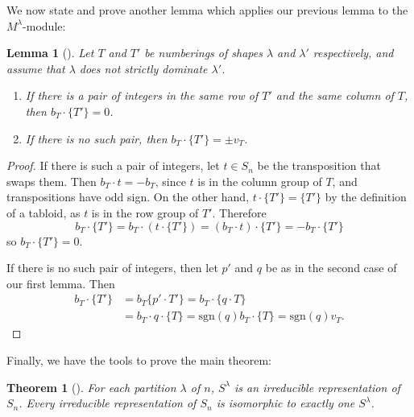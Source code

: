 \documentclass[12pt,twoside]{reedthesis}
\theoremstyle{plain}   %
\newtheorem{thm}{Theorem}[section] %
\newtheorem{lemma}{Lemma}[section]
\theoremstyle{definition}
\theoremstyle{remark}
\numberwithin{equation}{section}
\def\sgn{\mathrm{sgn}}
\begin{document}
  We now state and prove another lemma which applies our previous lemma to the $M^\lambda$-module:
  \begin{lemma}[{\cite[Lemma 7.2]{fulton}}]\label{lem2}
    Let $T$ and $T'$ be numberings of shapes $\lambda$ and $\lambda'$ respectively,
    and assume that $\lambda$ does not strictly dominate $\lambda'$. \\
    \begin{enumerate}

    \item If there is a pair of integers in the same row of $T'$ and the same column of $T$, then $b_T \cdot \{T'\} = 0$.
    \item If there is no such pair, then $b_T \cdot \{T'\} = \pm v_T$.
    \end{enumerate}
  \end{lemma}
  \begin{proof}    
    If there is such a pair of integers, let $t \in S_n$ be the transposition that swaps them.
    Then $b_T \cdot t = -b_T$, since $t$ is in the column group of $T$, and transpositions have odd sign.
    On the other hand, $t \cdot \{T'\} = \{T'\}$ by the definition of a tabloid, as $t$ is in the row group of $T'$.
    Therefore
    \[b_T \cdot \{T'\} = b_T \cdot (t \cdot \{T'\}) = (b_T \cdot t) \cdot \{T'\} = - b_T \cdot \{T'\}\]
    so $b_T \cdot \{T'\} = 0$.\par
    If there is no such pair of integers, then let $p'$ and $q$ be as in the second case of our first lemma.
    Then
    \begin{align*}
      b_T \cdot \{ T'\} &=b_T \{p' \cdot T'\} = b_T \cdot \{ q \cdot T\} \\
                        &= b_T \cdot q \cdot \{T\} = \sgn(q) b_T \cdot \{T\} = \sgn(q) v_T.
    \end{align*}
  \end{proof}
  Finally, we have the tools to prove the main theorem:
  \begin{thm}[{\cite[ Pg. 87-88]{fulton}}]
    For each partition $\lambda$ of $n$, $S^\lambda$ is an irreducible representation of $S_n$. Every irreducible representation of
    $S_n$ is isomorphic to exactly one $S^\lambda$.
  \end{thm}
\end{document}
